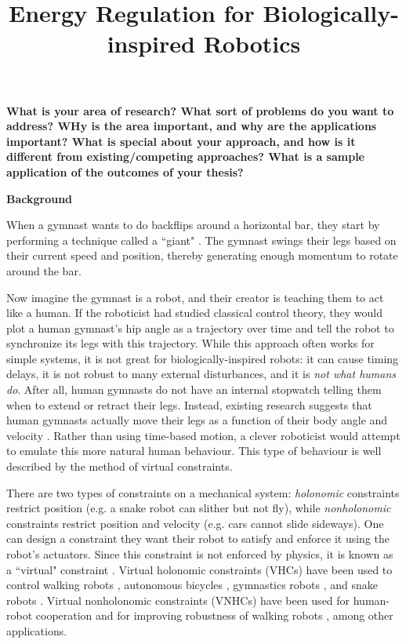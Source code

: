 \documentclass[a4paper,12pt]{article}
\begin{document}
\title{Energy Regulation for Biologically-inspired Robotics}
\author{}
\date{}
\maketitle

\vspace{-1cm} %
\textbf{What is your area of research? What sort of problems do you want to
    address? WHy is the area important, and why are the applications important?
    What is special about your approach, and how is it different from
    existing/competing approaches? What is a sample application of the outcomes
of your thesis?}

\begin{large}
\textbf{Background}
\end{large}

When a gymnast wants to do backflips around a horizontal bar, they start by
performing a technique called a ``giant" \cite{usagym_giant}. 
The gymnast swings their legs based on their current speed and position, thereby
generating enough momentum to rotate around the bar.

Now imagine the gymnast is a robot, and their creator is teaching them to act
like a human.
If the roboticist had studied classical control theory, they would plot a
human gymnast's hip angle as a trajectory over time and tell the robot to synchronize
its legs with this trajectory.
While this approach often works for simple systems, it is not great for
biologically-inspired robots: it can cause timing delays, it is not robust to
many external disturbances, and it is \textit{not what humans do}.
After all, human gymnasts do not have an internal stopwatch telling them when to
extend or retract their legs.
Instead, existing research suggests that human gymnasts actually move their legs
as a function of their body angle and velocity
\cite{pendulum_length_giant_gymnastics}.
Rather than using time-based motion, a clever roboticist would attempt to
emulate this more natural human behaviour.
This type of behaviour is well described by the method of virtual constraints.

There are two types of constraints on a mechanical system:
\textit{holonomic} constraints restrict position (e.g. a snake robot can slither
but not fly),
while \textit{nonholonomic} constraints restrict position and
velocity (e.g. cars cannot slide sideways).
One can design a constraint they want their robot to satisfy and enforce it
using the robot's actuators.
Since this constraint is not enforced by physics, it is known as a ``virtual"
constraint \cite{vhcs_for_el_systems}.
Virtual holonomic constraints (VHCs) have been used to control walking robots
\cite{stable-walking}, autonomous bicycles \cite{bicycle},
gymnastics robots \cite{xingbo-thesis}, and snake robots \cite{snake-robot}.
Virtual nonholonomic constraints (VNHCs) have been used for human-robot
cooperation \cite{vnhc-human-robot-coop} and for improving robustness of walking
robots \cite{vnhc-biped-robot,hybrid_zero_dynamics_bipedal_nhvcs}, among other
applications.
\end{document}
